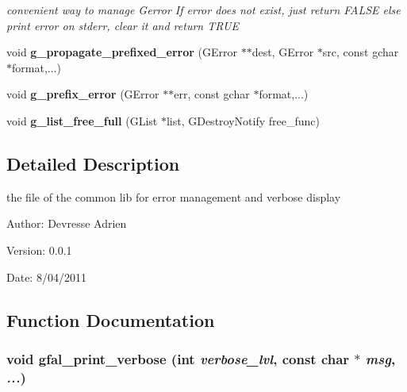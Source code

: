 \begin{CompactItemize}
\begin{CompactList}\small\item\em convenient way to manage Gerror If error does not exist, just return FALSE else print error on stderr, clear it and return TRUE \item\end{CompactList}\item 
void \textbf{g\_\-propagate\_\-prefixed\_\-error} (GError $\ast$$\ast$dest, GError $\ast$src, const gchar $\ast$format,...)\label{gfal__common__errverbose_8c_ba441719ee1fd49a708add03c0eea22f}

\item 
void \textbf{g\_\-prefix\_\-error} (GError $\ast$$\ast$err, const gchar $\ast$format,...)\label{gfal__common__errverbose_8c_0c7cc2a68d8e7b0bed51a834aa54fa0d}

\item 
void \textbf{g\_\-list\_\-free\_\-full} (GList $\ast$list, GDestroy\-Notify free\_\-func)\label{gfal__common__errverbose_8c_0d507092f75c2411862d210dbecbc4e5}

\end{CompactItemize}


\subsection{Detailed Description}
the file of the common lib for error management and verbose display 

\begin{Desc}
\item[Author:]Devresse Adrien \end{Desc}
\begin{Desc}
\item[Version:]0.0.1 \end{Desc}
\begin{Desc}
\item[Date:]8/04/2011 \end{Desc}


\subsection{Function Documentation}
\subsubsection{\setlength{\rightskip}{0pt plus 5cm}void gfal\_\-print\_\-verbose (int {\em verbose\_\-lvl}, const char $\ast$ {\em msg},  {\em ...})}\label{gfal__common__errverbose_8c_8b05640b4b43a776603bd93703c29d30}


